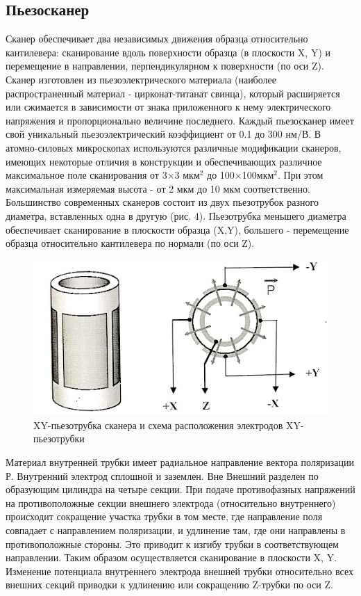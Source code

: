 \documentclass[a4paper,12pt]{article}
\theoremstyle{plain} %
\theoremstyle{definition} %
\theoremstyle{remark} %
\begin{document}
\subsection{Пьезосканер}
Сканер обеспечивает два независимых движения образца относительно кантилевера: сканирование вдоль поверхности образца (в плоскости X, Y) и перемещение в направлении, перпендикулярном к поверхности (по оси Z). Сканер изготовлен из пьезоэлектрического материала (наиболее распространенный материал - цирконат-титанат свинца), который расширяется или сжимается в зависимости от знака приложенного к нему электрического напряжения и пропорционально величине последнего. Каждый пьезосканер имеет свой уникальный пьезоэлектрический коэффициент от 0.1 до 300 нм/В. В атомно-силовых микроскопах используются различные модификации сканеров, имеющих некоторые отличия в конструкции и обеспечивающих различное максимальное поле сканирования от 3×3 $ мкм^2 $ до 100×100$  мкм^2 $. При этом максимальная измеряемая высота - от 2 мкм до 10 мкм соответственно. Большинство современных сканеров состоит из двух пьезотрубок разного диаметра, вставленных одна в другую (рис. 4). Пьезотрубка меньшего диаметра обеспечивает сканирование в плоскости образца (X,Y), большего - перемещение образца относительно кантилевера по нормали (по оси Z).
\begin{figure}[h]
	\centering
	\includegraphics[scale=0.6]{pic7.jpg}
	\caption{XY-пьезотрубка сканера и схема расположения электродов XY-пьезотрубки}
	\label{pic7}
\end{figure}
Материал внутренней трубки имеет радиальное направление вектора поляризации Р. Внутренний электрод сплошной и заземлен. Вне Внешний разделен по образующим цилиндра на четыре секции. При подаче противофазных напряжений на противоположные секции внешнего электрода (относительно внутреннего) происходит сокращение участка трубки в том месте, где направление поля совпадает с направлением поляризации, и удлинение там, где они направлены в противоположные стороны. Это приводит к изгибу трубки в соответствующем направлении. Таким образом осуществляется сканирование в плоскости X, Y. Изменение потенциала внутреннего электрода внешней трубки относительно всех внешних секций приводки к удлинению или сокращению Z-трубки по оси Z.
\end{document}
